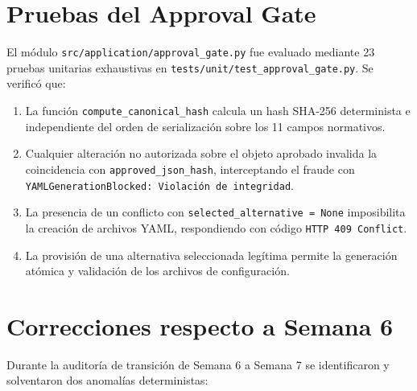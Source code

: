 \documentclass[11pt,a4paper]{article}
\begin{document}
\section{Pruebas del Approval Gate}
El módulo \texttt{src/application/approval\_gate.py} fue evaluado mediante 23 pruebas unitarias exhaustivas en \texttt{tests/unit/test\_approval\_gate.py}. Se verificó que:
\begin{enumerate}
    \item La función \texttt{compute\_canonical\_hash} calcula un hash SHA-256 determinista e independiente del orden de serialización sobre los 11 campos normativos.
    \item Cualquier alteración no autorizada sobre el objeto aprobado invalida la coincidencia con \texttt{approved\_json\_hash}, interceptando el fraude con \texttt{YAMLGenerationBlocked: Violación de integridad}.
    \item La presencia de un conflicto con \texttt{selected\_alternative = None} imposibilita la creación de archivos YAML, respondiendo con código \texttt{HTTP 409 Conflict}.
    \item La provisión de una alternativa seleccionada legítima permite la generación atómica y validación de los archivos de configuración.
\end{enumerate}

\section{Correcciones respecto a Semana 6}
Durante la auditoría de transición de Semana 6 a Semana 7 se identificaron y solventaron dos anomalías deterministas:
\end{document}
